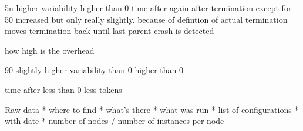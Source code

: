  5n
  higher variability
  higher than 0
 time after
   again after termination
   except for 50 increased
   but only really slightly. because of defintion of actual termination moves termination back until last parent crash is detected
  
  how high is the overhead
  
 90
   slightly higher variability than 0
   higher than 0 
   
  time after
    less than 0
    less tokens  
 
 


Raw data 
* where to find
* what's there
* what was run
* list of configurations
* with date
* number of nodes / number of instances per node


